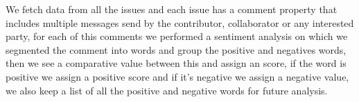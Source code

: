 We fetch data from all the issues and each issue has a comment property that includes multiple messages send by the contributor, collaborator or any interested party, for each of this comments we performed a sentiment analysis on which we segmented the comment into words and group the positive and negatives words, then we see a comparative value between this and assign an score, if the word is positive we assign a positive score and if it’s negative we assign a negative value, we also keep a list of all the positive and negative words for future analysis.